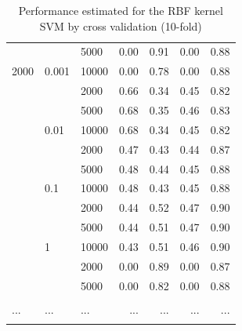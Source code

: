 \documentclass[a4paper,10pt]{article}
\begin{document}
\begin{table}[!ht]
\begin{multicols}{2}
\begin{scriptsize}
\begin{tabular}{|lllrrrr|}
      &       & 5000 &       0.00 &       0.91 &       0.00 &       0.88 \\
2000 & 0.001 & 10000 &       0.00 &       0.78 &       0.00 &       0.88 \\
      &       & 2000 &       0.66 &       0.34 &       0.45 &       0.82 \\
      &       & 5000 &       0.68 &       0.35 &       0.46 &       0.83 \\
      & 0.01 & 10000 &       0.68 &       0.34 &       0.45 &       0.82 \\
      &       & 2000 &       0.47 &       0.43 &       0.44 &       0.87 \\
      &       & 5000 &       0.48 &       0.44 &       0.45 &       0.88 \\
      & 0.1 & 10000 &       0.48 &       0.43 &       0.45 &       0.88 \\
      &       & 2000 &       0.44 &       0.52 &       0.47 &       0.90 \\
      &       & 5000 &       0.44 &       0.51 &       0.47 &       0.90 \\
      & 1 & 10000 &       0.43 &       0.51 &       0.46 &       0.90 \\
      &       & 2000 &       0.00 &       0.89 &       0.00 &       0.87 \\
      &       & 5000 &       0.00 &       0.82 &       0.00 &       0.88 \\
      & 	  &		 &            &            &            &            \\
 ...  &  ...  & ...  &   ...      &   ...      &   ...      &   ...      \\
      & 	  &		 &            &            &            &            \\
\bottomrule
\end{tabular}
\end{scriptsize}
\end{multicols}
\caption{Performance estimated for the RBF kernel SVM by cross validation (10-fold)}
\label{Cross_val: SVM}
\end{table}
\restoregeometry
\newpage

%

%

\end{document}

